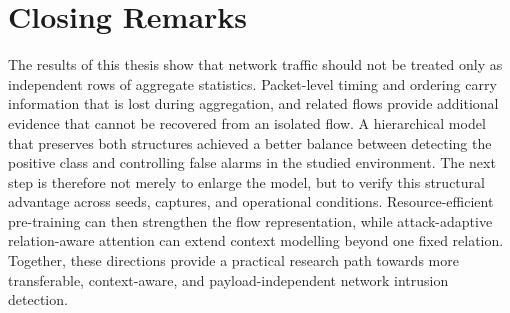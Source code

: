 \section{Closing Remarks}
\label{subsec:conclusion_closing}

The results of this thesis show that network traffic should not be treated only
as independent rows of aggregate statistics. Packet-level timing and ordering
carry information that is lost during aggregation, and related flows provide
additional evidence that cannot be recovered from an isolated flow. A
hierarchical model that preserves both structures achieved a better balance
between detecting the positive class and controlling false alarms in the
studied environment. The next step is therefore not merely to enlarge the
model, but to verify this structural advantage across seeds, captures, and
operational conditions. Resource-efficient pre-training can then strengthen the
flow representation, while attack-adaptive relation-aware attention can extend
context modelling beyond one fixed relation. Together, these directions provide
a practical research path towards more transferable, context-aware, and
payload-independent network intrusion detection.
